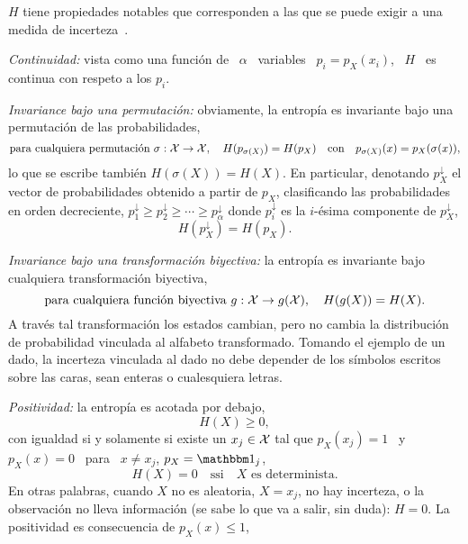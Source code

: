 $H$ tiene propiedades notables que corresponden  a las que se puede exigir a una
medida de incerteza~\cite{Sha48, ShaWea64, CovTho06, Rio07, DemCov91, Joh04}.
%
\begin{propiedades}
\item\label{Prop:SZ:continuidad} {\it Continuidad:}  vista como una funci\'on de
  \ $\alpha$ \ variables  \ $p_i = p_X(x_i)$, \ $H$ \  es continua con respeto a
  los $p_i$.
%
\setcounter{PropPermutacion}{\value{enumi}}
\item\label{Prop:SZ:permutacion}   {\it  Invariance  bajo   una  permutaci\'on:}
  obviamente,  la  entrop\'ia  es  invariante  bajo  una  permutaci\'on  de  las
  probabilidades, \ie
  \[
  \mbox{para   cualquiera   permutaci\'on   }   \sigma:   \mathcal{X}   \to   \mathcal{X},   \quad
  H(p_{\sigma(X)})   =  H(p_X)   \quad  \mbox{con}   \quad   p_{\sigma(X)}(x)  =
  p_X(\sigma(x)),
  \]
  lo que se  escribe tambi\'en $H(\sigma(X)) = H(X)$.   En particular, denotando
  $p_X^\downarrow$  el vector  de  probabilidades obtenido  a  partir de  $p_X$,
  clasificando  las  probabilidades en  orden  decreciente, $p_1^\downarrow  \ge
  p_2^\downarrow \ge  \cdots \ge p_\alpha^\downarrow$  donde $p_i^\downarrow$ es
  la $i$-\'esima componente de $p_X^\downarrow$,
  \[
  H(p_X^\downarrow) = H(p_X).
  \]
%
\setcounter{PropBiyeccion}{\value{enumi}}
\item\label{Prop:SZ:biyeccion}   {\it  Invariance   bajo   una  transformaci\'on
    biyectiva:}  la entrop\'ia  es invariante  bajo  cualquiera transformaci\'on
  biyectiva, \ie
  \[
  \mbox{para cualquiera  funci\'on biyectiva } g:  \mathcal{X} \to g(\mathcal{X}),  \quad H(g(X)) =
  H(X).
  \]
  A  trav\'es  tal transformaci\'on  los  estados  cambian,  pero no  cambia  la
  distribuci\'on de probabilidad vinculada al alfabeto transformado.  Tomando el
  ejemplo de  un dado, la  incerteza vinculada al  dado no debe depender  de los
  s\'imbolos escritos sobre las caras, sean enteras o cualesquiera letras.
%
\item\label{Prop:SZ:positividad} {\it Positividad:} la entrop\'ia es acotada por
  debajo,
  \[
  H(X) \ge 0,
  \]
  con igualdad si y solamente si existe un $x_j \in \mathcal{X}$ tal que $p_X(x_j) = 1$ \
  y \ $p_X(x) = 0$ \ para \ $x \ne x_j$, \ie $p_X = \un_j$,
  \[
  H(X)  =  0 \quad  \mbox{ssi}  \quad X  \mbox{  es  determinista.}
  \]
  En  otras  palabras, cuando  $X$  no  es aleatoria,  \ie  $X  =  x_j$, no  hay
  incerteza, o  la observaci\'on  no lleva  informaci\'on (se sabe  lo que  va a
  salir, sin duda): $H = 0$.   La positividad es consecuencia de $p_X(x) \le 1$,

\end{propiedades}
